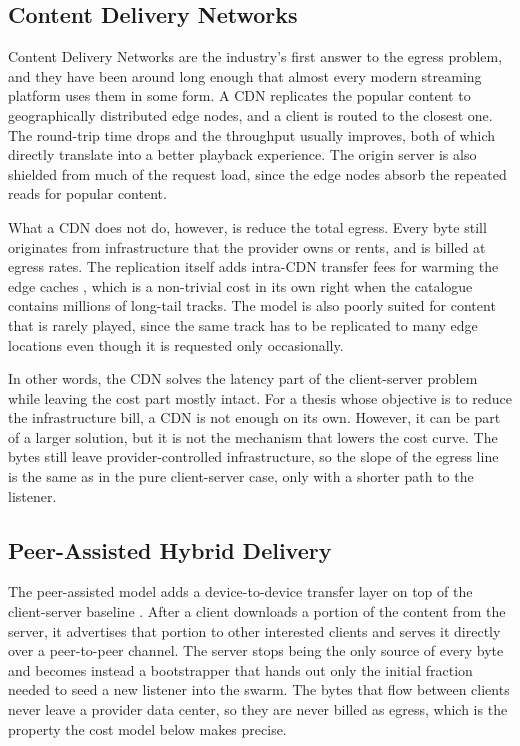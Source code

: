 \subsection{Content Delivery Networks}
\label{subsec:cdn}

\indent \par Content Delivery Networks are the industry's first answer to the egress problem, and they have been around long enough that almost every modern streaming platform uses them in some form. A CDN replicates the popular content to geographically distributed edge nodes, and a client is routed to the closest one. The round-trip time drops and the throughput usually improves, both of which directly translate into a better playback experience. The origin server is also shielded from much of the request load, since the edge nodes absorb the repeated reads for popular content.

\par What a CDN does not do, however, is reduce the total egress. Every byte still originates from infrastructure that the provider owns or rents, and is billed at egress rates. The replication itself adds intra-CDN transfer fees for warming the edge caches \cite{web_performance}, which is a non-trivial cost in its own right when the catalogue contains millions of long-tail tracks. The model is also poorly suited for content that is rarely played, since the same track has to be replicated to many edge locations even though it is requested only occasionally.

\par In other words, the CDN solves the latency part of the client-server problem while leaving the cost part mostly intact. For a thesis whose objective is to reduce the infrastructure bill, a CDN is not enough on its own. However, it can be part of a larger solution, but it is not the mechanism that lowers the cost curve. The bytes still leave provider-controlled infrastructure, so the slope of the egress line is the same as in the pure client-server case, only with a shorter path to the listener.

\subsection{Peer-Assisted Hybrid Delivery}
\label{subsec:hybrid}

\indent \par The peer-assisted model adds a device-to-device transfer layer on top of the client-server baseline \cite{d2d_survey}. After a client downloads a portion of the content from the server, it advertises that portion to other interested clients and serves it directly over a peer-to-peer channel. The server stops being the only source of every byte and becomes instead a bootstrapper that hands out only the initial fraction needed to seed a new listener into the swarm. The bytes that flow between clients never leave a provider data center, so they are never billed as egress, which is the property the cost model below makes precise.

